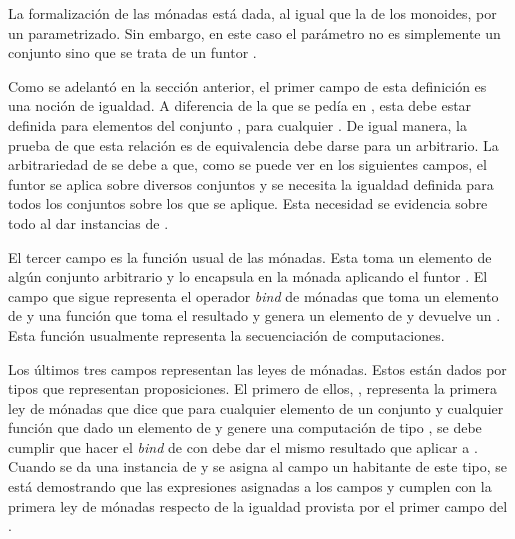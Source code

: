 La formalización de las mónadas está dada, al igual que la de los monoides, por un  parametrizado. Sin embargo, en este caso el parámetro no es simplemente un conjunto sino que se trata de un funtor  \AgdaSymbol{:}  \AgdaSymbol{$\rightarrow$} . 


Como se adelantó en la sección anterior, el primer campo de esta definición es una noción de igualdad. A diferencia de la que se pedía en , esta debe estar definida para elementos del conjunto , para cualquier . De igual manera, la prueba de que esta relación es de equivalencia debe darse para un  arbitrario. La arbitrariedad de  se debe a que, como se puede ver en los siguientes campos, el funtor  se aplica sobre diversos conjuntos y se necesita la igualdad definida para todos los conjuntos sobre los que  se aplique. Esta necesidad se evidencia sobre todo al dar instancias de .

El tercer campo es la función  usual de las mónadas. Esta toma un elemento de algún conjunto  arbitrario y lo encapsula en la mónada aplicando el funtor . El campo que sigue representa el operador \textit{bind} de mónadas que toma un elemento de  y una función que toma el resultado  y genera un elemento de  y devuelve un . Esta función usualmente representa la secuenciación de computaciones. 

Los últimos tres campos representan las leyes de mónadas. Estos están dados por tipos que representan proposiciones. El primero de ellos, , representa la primera ley de mónadas que dice que para cualquier elemento  de un conjunto  y cualquier función  que dado un elemento de  y genere una computación de tipo , se debe cumplir que hacer el \textit{bind} de   con  debe dar el mismo resultado que aplicar  a . Cuando se da una instancia de  y se asigna al campo  un habitante de este tipo, se está demostrando que las expresiones asignadas a los campos  y \AgdaField{$\_\gg=\_$} cumplen con la primera ley de mónadas respecto de la igualdad provista por el primer campo del .

